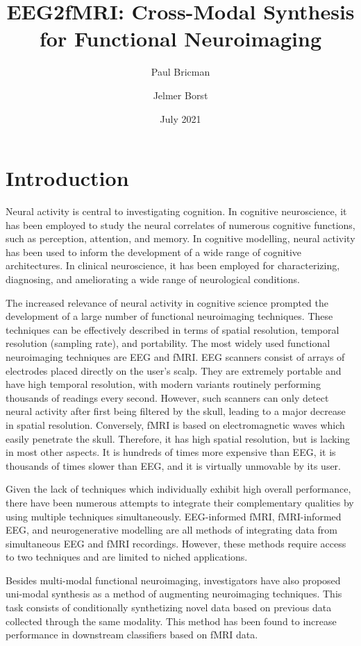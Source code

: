 \documentclass{article}
\title{EEG2fMRI: Cross-Modal Synthesis for Functional Neuroimaging}
\author{Paul Bricman}
\author{Jelmer Borst}
\affil{University of Groningen}
\date{July 2021}
\begin{document}
\maketitle

\section{Introduction}

Neural activity is central to investigating cognition. In cognitive neuroscience, it has been employed to study the neural correlates of numerous cognitive functions, such as perception, attention, and memory. In cognitive modelling, neural activity has been used to inform the development of a wide range of cognitive architectures. In clinical neuroscience, it has been employed for characterizing, diagnosing, and ameliorating a wide range of neurological conditions. 

The increased relevance of neural activity in cognitive science prompted the development of a large number of functional neuroimaging techniques. These techniques can be effectively described in terms of spatial resolution, temporal resolution (sampling rate), and portability. The most widely used functional neuroimaging techniques are EEG and fMRI. EEG scanners consist of arrays of electrodes placed directly on the user's scalp. They are extremely portable and have high temporal resolution, with modern variants routinely performing thousands of readings every second. However, such scanners can only detect neural activity after first being filtered by the skull, leading to a major decrease in spatial resolution. Conversely, fMRI is based on electromagnetic waves which easily penetrate the skull. Therefore, it has high spatial resolution, but is lacking in most other aspects. It is hundreds of times more expensive than EEG, it is thousands of times slower than EEG, and it is virtually unmovable by its user.

Given the lack of techniques which individually exhibit high overall performance, there have been numerous attempts to integrate their complementary qualities by using multiple techniques simultaneously. EEG-informed fMRI, fMRI-informed EEG, and neurogenerative modelling are all methods of integrating data from simultaneous EEG and fMRI recordings. However, these methods require access to two techniques and are limited to niched applications.

Besides multi-modal functional neuroimaging, investigators have also proposed uni-modal synthesis as a method of augmenting neuroimaging techniques. This task consists of conditionally synthetizing novel data based on previous data collected through the same modality. This method has been found to increase performance in downstream classifiers based on fMRI data.
\end{document}

